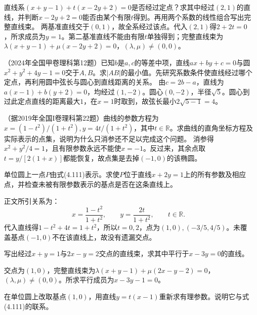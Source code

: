 直线系\((x+y-1)+t(x-2y+2)=0\)是否经过定点？求其中经过\((2,1)\)的直线，并判断\(x-2y+2=0\)能否由某个有限\(t\)得到。再用两个系数的线性组合写出完整直线束。
\solutionanswer
两基准直线交于\((0,1)\)，故全系经过该点。代入\((2,1)\)得\(2+2t=0\)，所求成员为\(y=1\)。第二基准直线不能由有限\(t\)单独得到；完整直线束为\(\lambda(x+y-1)+\mu(x-2y+2)=0\)，\((\lambda,\mu)\ne(0,0)\)。


（2024年全国甲卷理科第12题）已知\(b\)是\(a,c\)的等差中项，直线\(ax+by+c=0\)与圆\(x^2+y^2+4y-1=0\)交于\(A,B\)。求\(|AB|\)的最小值。先研究系数条件使直线经过哪个定点，再利用圆中弦长与圆心到直线距离的关系。
\solutionanswer
由\(c=2b-a\)，直线为\(a(x-1)+b(y+2)=0\)，均经过\((1,-2)\)。圆心\((0,-2)\)，半径\(\sqrt5\)。圆心到过此定点直线的距离最大\(1\)，在\(x=1\)时取到，故弦长最小\(2\sqrt{5-1}=4\)。


（据2019年全国I卷理科第22题）曲线的参数方程为\(x=(1-t^2)/(1+t^2),y=4t/(1+t^2)\)，其中\(t\in\mathbb R\)。求曲线的直角坐标方程及实际表示的点集，说明为什么只消参还不足以完成这个问题。
\solutionanswer
消参得\(x^2+y^2/4=1\)，且有限参数永远不能使\(x=-1\)。反过来，其余点取\(t=y/[2(1+x)]\)都能恢复，故点集是去掉\((-1,0)\)的该椭圆。


单位圆上一点\(P\)由式\textup{(4.111)}表示。求使\(P\)位于直线\(x+2y=1\)上的所有参数及相应点，并检查未被有限参数表示的基点是否在这条直线上。

\par\smallskip\noindent 正文所引关系为：
\begin{equation*}
x=\frac{1-t^2}{1+t^2},\qquad
    y=\frac{2t}{1+t^2},\qquad t\in\mathbb R .
\end{equation*}
\solutionanswer
代入直线得\(1-t^2+4t=1+t^2\)，所以\(t=0,2\)，点为\((1,0),(-3/5,4/5)\)。未覆盖基点\((-1,0)\)不在该直线上，故没有遗漏交点。


写出经过\(x+y=1\)与\(2x-y=2\)交点的直线束，求其中平行于\(x-3y=0\)的直线。
\par
\solutionanswer
交点为\((1,0)\)，完整直线束为\(\lambda(x+y-1)+\mu(2x-y-2)=0\)，\((\lambda,\mu)\ne(0,0)\)。所求平行成员为\(x-3y-1=0\)。


在单位圆上改取基点\((1,0)\)，用直线\(y=t(x-1)\)重新求有理参数。说明它与式\textup{(4.111)}的联系。
\par

